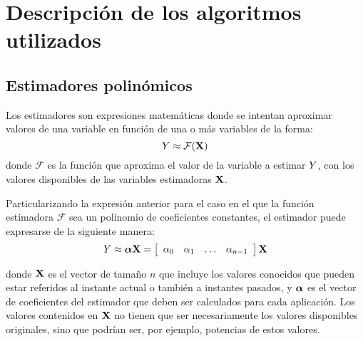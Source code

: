 
\chapter{Descripción de los algoritmos utilizados}
\label{ch:algoritmos}




\section{Estimadores polinómicos}

Los estimadores son expresiones matemáticas donde se intentan aproximar valores de una variable en función de una o más variables de la forma:
%
\begin{equation}
    \estimated \approx \mathcal{F}(\estimation)
\end{equation}
%
donde $\mathcal{F}$ es la función que aproxima el valor de la variable a estimar $\estimated$, con los valores disponibles de las variables estimadoras $\estimation$.


Particularizando la expresión anterior para el caso en el que la función estimadora $\mathcal{F}$ sea un polinomio de coeficientes constantes, el estimador puede expresarse de la siguiente manera:
%
\begin{equation}
    \estimated \approx \coefficients \estimation = \sqbr{\hvect{cccc}{\coefficient_0 & \coefficient_1 & \hdots & \coefficient_{n-1}}} \estimation
\end{equation}

donde $\estimation$ es el vector de tamaño $n$ que incluye los valores conocidos que pueden estar referidos al instante actual o también a instantes pasados, y $\coefficients$ es el vector de coeficientes del estimador que deben ser calculados para cada aplicación. Los valores contenidos en $\estimation$ no tienen que ser necesariamente los valores disponibles originales, sino que podrían ser, por ejemplo, potencias de estos valores.

